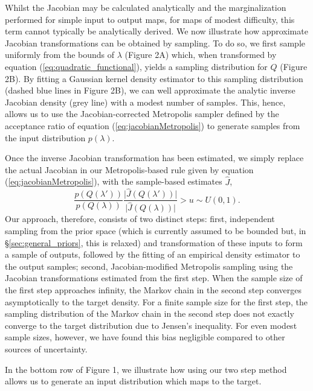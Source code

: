 \documentclass[10pt,letterpaper]{article}
\begin{document}
Whilst the Jacobian may be calculated analytically and the marginalization performed for simple input to output maps, for maps of modest difficulty, this term cannot typically be analytically derived. We now illustrate how approximate Jacobian transformations can be obtained by sampling. To do so, we first sample uniformly from the bounds of $\lambda$ (Figure 2A) which, when transformed by equation (\ref{eq:quadratic_functional}), yields a sampling distribution for $Q$ (Figure 2B). By fitting a Gaussian kernel density estimator to this sampling distribution (dashed blue lines in Figure 2B), we can well approximate the analytic inverse Jacobian density (grey line) with a modest number of samples. This, hence, allows us to use the Jacobian-corrected Metropolis sampler defined by the acceptance ratio of equation (\ref{eq:jacobianMetropolis}) to generate samples from the input distribution $p(\lambda)$.

Once the inverse Jacobian transformation has been estimated, we simply replace the actual Jacobian in our Metropolis-based rule given by equation (\ref{eq:jacobianMetropolis}), with the sample-based estimates $\hat{J}$,
%
\begin{equation}\label{eq:jacobianMetropolisBySampling}
\frac{p(Q(\lambda'))}{p(Q(\lambda))}\frac{\vert \hat{J}(Q(\lambda')) \vert}{\vert \hat{J}(Q(\lambda)) \vert}>u\sim U(0,1).
\end{equation}
%
Our approach, therefore, consists of two distinct steps: first, independent sampling from the prior space (which is currently assumed to be bounded but, in \S \ref{sec:general_priors}, this is relaxed) and transformation of these inputs to form a sample of outputs, followed by the fitting of an empirical density estimator to the output samples; second, Jacobian-modified Metropolis sampling using the Jacobian transformations estimated from the first step. When the sample size of the first step approaches infinity, the Markov chain in the second step converges asymptotically to the target density. For a finite sample size for the first step, the sampling distribution of the Markov chain in the second step does not exactly converge to the target distribution due to Jensen's inequality. For even modest sample sizes, however, we have found this bias negligible compared to other sources of uncertainty.

In the bottom row of Figure 1, we illustrate how using our two step method allows us to generate an input distribution which maps to the target.
\end{document}
